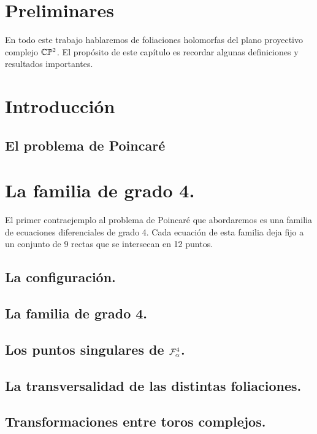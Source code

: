 \documentclass[10pt]{book}
\theoremstyle{definition}
\begin{document}
\tableofcontents
\chapter{Preliminares}

En todo este trabajo hablaremos de foliaciones holomorfas del plano proyectivo complejo $\CP$. El propósito de este capítulo es recordar algunas definiciones y resultados importantes.

     

\chapter{Introducción}

  \section{El problema de Poincaré}

    

\chapter{La familia de grado 4.}

El primer contraejemplo al problema de Poincaré que abordaremos es una familia de ecuaciones diferenciales de grado 4. Cada ecuación de esta familia deja fijo a un conjunto de 9 rectas que se intersecan en 12 puntos. 

	\section{La configuración.}

     	    

	\section{La familia de grado 4.}

     	    

  	\section{Los puntos singulares de $\Fol[4]{\alpha}$.}

     	       
     	    
     	    

        \section{La transversalidad de las distintas foliaciones.}

            

        \section{Transformaciones entre toros complejos.}
        
            


\end{document}
